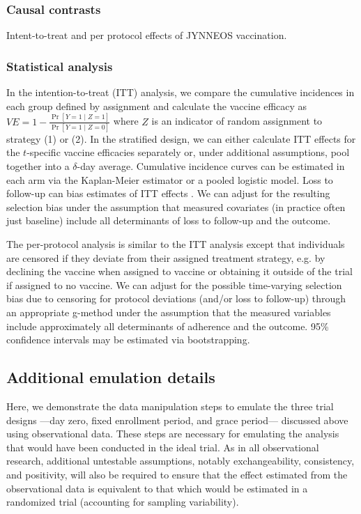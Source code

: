 \begin{appendix}
    \subsubsection*{Causal contrasts}
    Intent-to-treat and per protocol effects \cite{hernan_per-protocol_2017} of JYNNEOS vaccination.

    \subsubsection*{Statistical analysis}
    In the intention-to-treat (ITT) analysis, we compare the cumulative incidences in each group defined by assignment and calculate the vaccine efficacy as $VE = 1 - \frac{\Pr[Y = 1 \mid Z = 1]}{\Pr[Y = 1 \mid Z = 0]}$ where $Z$ is an indicator of random assignment to strategy (1) or (2). In the stratified design, we can either calculate ITT effects for the $t$-specific vaccine efficacies separately or, under additional assumptions, pool together into a $\delta$-day average. Cumulative incidence curves can be estimated in each arm via the Kaplan-Meier estimator or a pooled logistic model. Loss to follow-up can bias estimates of ITT effects \cite{stensrud_why_2020}. We can adjust for the resulting selection bias under the assumption that measured covariates (in practice often just baseline) include all determinants of loss to follow-up and the outcome.

    The per-protocol analysis is similar to the ITT analysis except that individuals are censored if they deviate from their assigned treatment strategy, e.g. by declining the vaccine when assigned to vaccine or obtaining it outside of the trial if assigned to no vaccine. We can adjust for the possible time-varying selection bias due to censoring for protocol deviations (and/or loss to follow-up) through an appropriate g-method under the assumption that the measured variables include approximately all determinants of adherence and the outcome. 95\% confidence intervals may be estimated via bootstrapping.

    \subsection{Additional emulation details} \label{sec:datamanip}
    Here, we demonstrate the data manipulation steps to emulate the three trial designs ---day zero, fixed enrollment period, and grace period--- discussed above using observational data. These steps are necessary for emulating the analysis that would have been conducted in the ideal trial. As in all observational research, additional untestable assumptions, notably exchangeability, consistency, and positivity, will also be required to ensure that the effect estimated from the observational data is equivalent to that which would be estimated in a randomized trial (accounting for sampling variability). 


\end{appendix}
